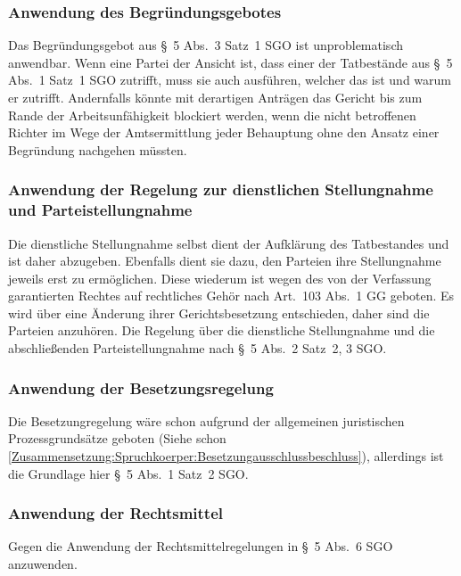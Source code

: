 \subsubsection{Anwendung des Begründungsgebotes}
\label{Zusammensetzung:Spruchkoerper:Befangenheitsvermutung:Begruendungsgebot}
Das Begründungsgebot aus \S~5 Abs.~3 Satz~1 SGO ist unproblematisch anwendbar.
Wenn eine Partei der Ansicht ist, dass einer der Tatbestände aus \S~5 Abs.~1 Satz~1 SGO zutrifft, muss sie auch ausführen, welcher das ist und warum er zutrifft.
Andernfalls könnte mit derartigen Anträgen das Gericht bis zum Rande der Arbeitsunfähigkeit blockiert werden, wenn die nicht betroffenen Richter im Wege der Amtsermittlung jeder Behauptung ohne den Ansatz einer Begründung nachgehen müssten.

\subsubsection{Anwendung der Regelung zur dienstlichen Stellungnahme und Parteistellungnahme}
\label{Zusammensetzung:Spruchkoerper:Befangenheitsvermutung:Stellungnahme}
Die dienstliche Stellungnahme selbst dient der Aufklärung des Tatbestandes und ist daher abzugeben.
Ebenfalls dient sie dazu, den Parteien ihre Stellungnahme jeweils erst zu ermöglichen.
Diese wiederum ist wegen des von der Verfassung garantierten Rechtes auf rechtliches Gehör nach Art.~103 Abs.~1 GG geboten.
Es wird über eine Änderung ihrer Gerichtsbesetzung entschieden, daher sind die Parteien anzuhören.
Die Regelung über die dienstliche Stellungnahme und die abschließenden Parteistellungnahme nach \S~5 Abs.~2 Satz~2, 3 SGO.

\subsubsection{Anwendung der Besetzungsregelung}
\label{Zusammensetzung:Spruchkoerper:Befangenheitsvermutung:Besetzung}
Die Besetzungregelung wäre schon aufgrund der allgemeinen juristischen Prozessgrundsätze geboten (Siehe schon \ref{Zusammensetzung:Spruchkoerper:Besetzungausschlussbeschluss}), allerdings ist die Grundlage hier \S~5 Abs.~1 Satz~2 SGO.

\subsubsection{Anwendung der Rechtsmittel}
\label{Zusammensetzung:Spruchkoerper:Befangenheitsvermutung:Rechtsmittel}
Gegen die Anwendung der Rechtsmittelregelungen in \S~5 Abs.~6 SGO anzuwenden.

